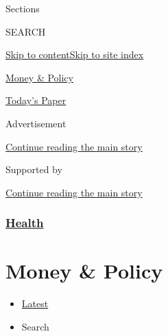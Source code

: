 Sections

SEARCH

\protect\hyperlink{site-content}{Skip to
content}\protect\hyperlink{site-index}{Skip to site index}

\href{https://www.nytimes.com/section/health/policy}{Money \& Policy}

\href{https://myaccount.nytimes.com/auth/login?response_type=cookie\&client_id=vi}{}

\href{https://www.nytimes.com/section/todayspaper}{Today's Paper}

Advertisement

\protect\hyperlink{after-top}{Continue reading the main story}

Supported by

\protect\hyperlink{after-sponsor}{Continue reading the main story}

\hypertarget{health}{%
\subsubsection{\texorpdfstring{\href{/section/health}{Health}}{Health}}\label{health}}

\hypertarget{money--policy}{%
\section{Money \& Policy}\label{money--policy}}

\begin{itemize}
\tightlist
\item
  \protect\hyperlink{stream-panel}{Latest}
\item
  Search
\end{itemize}


